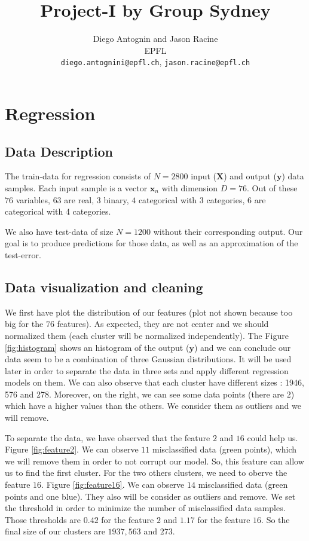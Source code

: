 \documentclass{article} %
\title{Project-I by Group Sydney}
\author{
Diego Antognin and Jason Racine \\
EPFL \\
\texttt{diego.antognini@epfl.ch}, \texttt{jason.racine@epfl.ch} \\
}
\begin{document}
\maketitle

\begin{abstract}

\end{abstract}

\section{Regression}

\subsection{Data Description}

The train-data for regression consists of $N = 2800$ input ($\mathbf{X}$) and output ($\mathbf{y}$) data samples. Each input sample is a vector $\mathbf{x}_n$ with dimension $D = 76$. Out of these $76$ variables, $63$ are real, $3$ binary, $4$ categorical with 3 categories, $6$ are categorical with 4 categories.

We also have test-data of size $N=1200$ without their corresponding output. Our goal is to produce predictions for those data, as well as an approximation of the test-error.

\subsection{Data visualization and cleaning}

We first have plot the distribution of our features (plot not shown because too big for the $76$ features). As expected, they are not center and we should normalized them (each cluster will be normalized independently). The Figure \ref{fig:histogram} shows an histogram of the output ($\mathbf{y}$) and we can conclude our data  seem to be a combination of three Gaussian distributions. It will be used later in order to separate the data in three sets and apply different regression models on them. We can also observe that each cluster have different sizes : 1946, 576 and 278. Moreover, on the right, we can see some data points (there are $2$) which have a higher values than the others. We consider them as outliers and we will remove.

To separate the data, we have observed that the feature $2$ and $16$ could help us. Figure \ref{fig:feature2}. We can observe $11$ misclassified data (green points), which we will remove them in order to not corrupt our model.  So, this feature can allow us to find the first cluster. For the two others clusters, we need to oberve the feature $16$. Figure \ref{fig:feature16}. We can observe $14$ misclassified data (green points and one blue). They also will be consider as outliers and remove. We set the threshold in order to minimize the number of misclassified data samples. Those thresholds are $0.42$ for the feature $2$ and $1.17$ for the feature $16$. So the final size of our clusters are $1937, 563$ and $273$.
\end{document}
